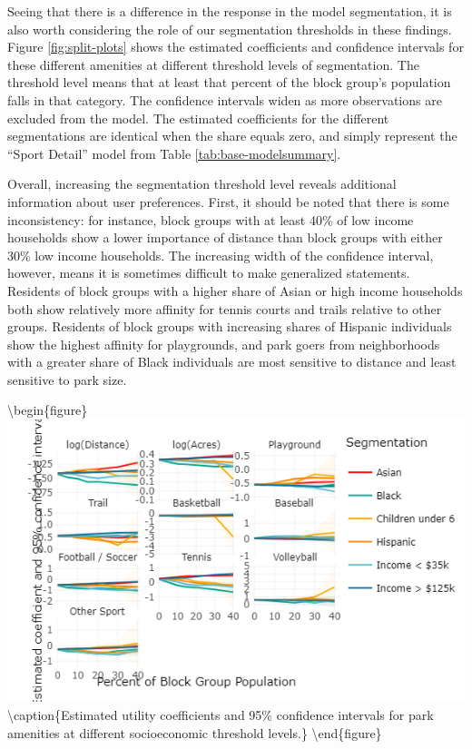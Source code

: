 \documentclass[3p, authoryear, review]{elsarticle} %
\begin{document}
Seeing that there is a difference in the response in the model segmentation, it is also worth considering the role of our segmentation thresholds in these findings. Figure \ref{fig:split-plots} shows the estimated coefficients and confidence intervals for these different amenities at different threshold levels of segmentation. The threshold level means that at least that percent of the block group's population falls in that category. The confidence intervals widen as more observations are excluded from the model. The estimated coefficients for the different segmentations are identical when the share equals zero, and simply represent the ``Sport Detail'' model from Table \ref{tab:base-modelsummary}.

Overall, increasing the segmentation threshold level reveals additional information about user preferences. First, it should be noted that there is some inconsistency: for instance, block groups with at least 40\% of low income households show a lower importance of distance than block groups with either 30\% low income households. The increasing width of the confidence interval, however, means it is sometimes difficult to make generalized statements. Residents of block groups with a higher share of Asian or high income households both show relatively more affinity for tennis courts and trails relative to other groups. Residents of block groups with increasing shares of Hispanic individuals show the highest affinity for playgrounds, and park goers from neighborhoods with a greater share of Black individuals are most sensitive to distance and least sensitive to park size.

\textbackslash begin\{figure\}
\includegraphics[width=7.96in]{images/split_plot} \textbackslash caption\{Estimated utility coefficients and 95\% confidence intervals for park amenities at different socioeconomic threshold levels.\}\label{fig:split-plots-knit}
\textbackslash end\{figure\}
\end{document}
